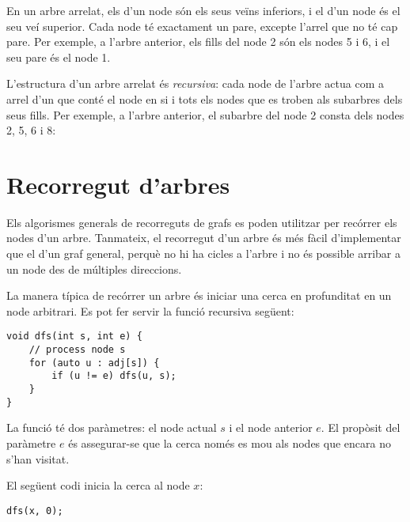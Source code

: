 En un arbre arrelat, els  d'un node són els seus veïns
inferiors, i el  d'un node és el seu veí superior. Cada
node té exactament un pare, excepte l'arrel que no té cap pare. Per
exemple, a l'arbre anterior, els fills del node 2 són els nodes 5 i 6,
i el seu pare és el node 1.


L'estructura d'un arbre arrelat és \emph{recursiva}: cada node de
l'arbre actua com a arrel d'un  que conté el node en si
i tots els nodes que es troben als subarbres dels seus fills. Per
exemple, a l'arbre anterior, el subarbre del node 2 consta dels nodes
2, 5, 6 i 8:
\begin{center}
\end{center}


\section{Recorregut d'arbres}

Els algorismes generals de recorreguts de grafs es poden utilitzar per
recórrer els nodes d'un arbre. Tanmateix, el recorregut d'un arbre és
més fàcil d'implementar que el d'un graf general, perquè no hi ha
cicles a l'arbre i no és possible arribar a un node des de múltiples
direccions.

La manera típica de recórrer un arbre és iniciar una cerca en
profunditat en un node arbitrari. Es pot fer servir la funció recursiva
següent:


\begin{lstlisting}
void dfs(int s, int e) {
    // process node s
    for (auto u : adj[s]) {
        if (u != e) dfs(u, s);
    }
}
\end{lstlisting}


La funció té dos paràmetres: el node actual $s$ i el node anterior
$e$. El propòsit del paràmetre $e$ és assegurar-se que la cerca només
es mou als nodes que encara no s'han visitat.

El següent codi inicia la cerca al node $x$:


\begin{lstlisting}
dfs(x, 0);
\end{lstlisting}


